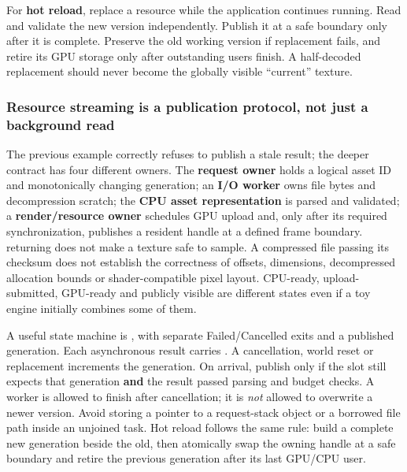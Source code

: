 For \textbf{hot reload}, replace a resource while the application continues running. Read and validate the new version independently. Publish it at a safe boundary only after it is complete. Preserve the old working version if replacement fails, and retire its GPU storage only after outstanding users finish. A half-decoded replacement should never become the globally visible ``current'' texture.

\subsubsection{Resource streaming is a publication protocol, not just a background read}\label{06-engine-ii-ch027-resource-streaming-is-a-publication-protocol-not-just-a-background-read}

\hypertarget{06-engine-ii-ch027-resource-streaming-is-a-publication-protocol-not-just-a-background-read}{}

The previous example correctly refuses to publish a stale result; the deeper contract has four different owners. The \textbf{request owner} holds a logical asset ID and monotonically changing generation; an \textbf{I/O worker} owns file bytes and decompression scratch; the \textbf{CPU asset representation} is parsed and validated; a \textbf{render/resource owner} schedules GPU upload and, only after its required synchronization, publishes a resident handle at a defined frame boundary.  returning does not make a texture safe to sample. A compressed file passing its checksum does not establish the correctness of offsets, dimensions, decompressed allocation bounds or shader-compatible pixel layout. CPU-ready, upload-submitted, GPU-ready and publicly visible are different states even if a toy engine initially combines some of them.

A useful state machine is , with separate Failed/Cancelled exits and a published generation. Each asynchronous result carries . A cancellation, world reset or replacement increments the generation. On arrival, publish only if the slot still expects that generation \textbf{and} the result passed parsing and budget checks. A worker is allowed to finish after cancellation; it is \emph{not} allowed to overwrite a newer version. Avoid storing a pointer to a request-stack object or a borrowed file path inside an unjoined task. Hot reload follows the same rule: build a complete new generation beside the old, then atomically swap the owning handle at a safe boundary and retire the previous generation after its last GPU/CPU user.

